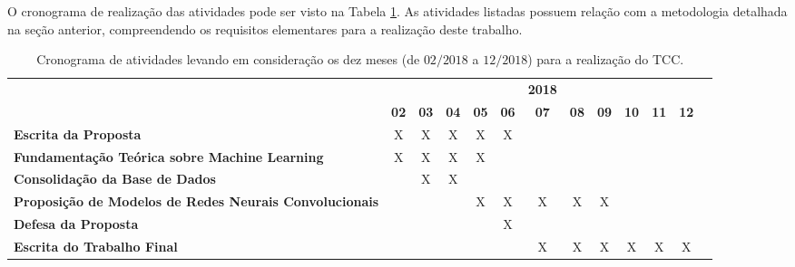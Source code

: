 
O cronograma de realização das atividades pode ser visto na Tabela \ref{tab:cronograma}. As atividades listadas possuem relação com a metodologia detalhada na seção anterior, compreendendo os requisitos elementares para a realização deste trabalho.\newline

\begin{table}[!ht]
\caption{Cronograma de atividades levando em consideração os dez meses (de $02/2018$ a $12/2018$) para a realização do TCC.}
\label{tab:cronograma}

\begin{center}
\begin{small}
\begin{tabular}{p{5cm}cccccccccccc}
  \toprule
  & &  &  & &  & \textbf{2018}  & &  &  &  &  & \\
                                        & \textbf{02} & \textbf{03} & \textbf{04} & \textbf{05} & \textbf{06} & \textbf{07} & \textbf{08} & \textbf{09} & \textbf{10} & \textbf{11} & \textbf{12} \\
  \midrule
  \textbf{Escrita da Proposta}          &      X      &      X      &      X      &      X      &      X      &             &             &             &             &             &             \\
  \textbf{Fundamentação Teórica sobre
  Machine Learning}                     &      X      &      X      &      X      &      X      &             &             &             &             &             &             &             \\
  \textbf{Consolidação da Base de Dados}&             &      X      &      X      &             &             &             &             &             &             &             &             \\
  \textbf{Proposição de Modelos de
  Redes Neurais Convolucionais}         &             &             &             &      X      &      X      &      X      &      X      &      X      &             &             &             \\
  \textbf{Defesa da Proposta}          &             &             &             &             &      X      &             &             &             &             &             &             \\
  \textbf{Escrita do Trabalho Final}    &             &             &             &             &             &      X      &      X      &      X      &      X      &      X      &      X      \\

\end{tabular}
\end{small}
\end{center}
\end{table}
